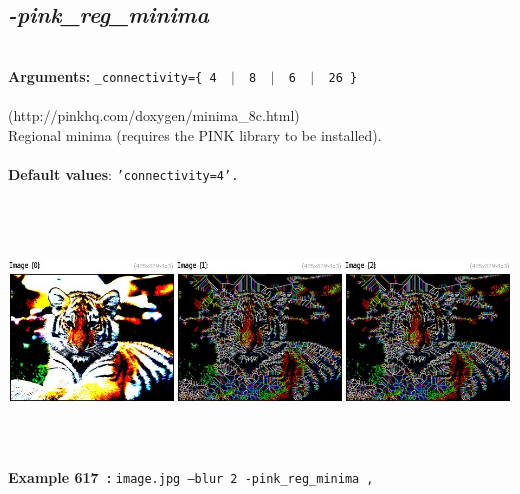 \documentclass[a4paper,11pt,twoside]{book}
\begin{document}
\subsection{\emph{-pink\_reg\_minima} }\vspace*{-0.5em}
~\\\textbf{Arguments: } 
{\small \texttt{\_connectivity=\{ 4 ~$|$~ 8 ~$|$~ 6 ~$|$~ 26 \}}}\\~\\
(http://pinkhq.com/doxygen/minima\_8c.html)
~\\Regional minima (requires the PINK library to be installed).
~\\~\\\textbf{Default values}: {\small \texttt{'connectivity=4'.}}
\begin{center}\includegraphics[keepaspectratio=true,height=7cm,width=\textwidth]{img/gmic_def617.jpg}\\
{\footnotesize \textbf{Example 617~:} \texttt{image.jpg --blur 2 -pink\_reg\_minima ,}}
\end{center}
\end{document}
